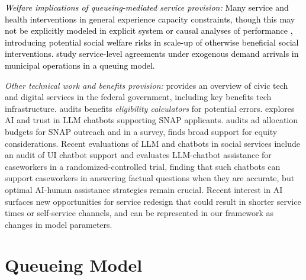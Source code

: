 \documentclass[manuscript,screen,authorversion]{acmart}
\newcommand{\rev}[1]{\textcolor{black}{#1}}
\begin{document}
\rev{\textit{Welfare implications of queueing-mediated service provision:} Many service and health interventions in general experience capacity constraints, though this may not be explicitly modeled in explicit system or causal analyses of performance \citep{miles2019causal,boutilier2024operational}, introducing potential social welfare risks in scale-up of otherwise beneficial social interventions. \citet{liu2024redesigning} study service-level agreements under exogenous demand arrivals in municipal operations in a queuing model.
}

 \textit{Other technical work and benefits provision:} \citet{pahlka2023recoding} provides an overview of civic tech and digital services in the federal government, including key benefits tech infrastructure. \citet{escher2020exposing} audits benefits \textit{eligibility calculators} for potential errors. \citet{jo2025ai} explores AI and trust in LLM chatbots supporting SNAP applicants. \citet{koenecke2023popular} audits ad allocation budgets for SNAP outreach and in a survey, finds broad support for equity considerations. Recent evaluations of LLM and chatbots in social services include an audit of UI chatbot support \citep{ho2025evaluation} and \citet{gosciak2026llms} evaluates LLM-chatbot assistance for caseworkers in a randomized-controlled trial, finding that such chatbots can support caseworkers in answering factual questions when they are accurate, but optimal AI-human assistance strategies remain crucial. Recent interest in AI surfaces new opportunities for service redesign that could result in shorter service times or self-service channels, and can be represented in our framework as changes in model parameters. 


 
\section{Queueing Model}



\end{document}
